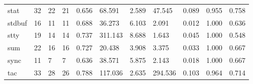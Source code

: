 \begin{longtable}{lp{1.2cm}p{1.2cm}p{1.2cm}p{1.2cm}p{1.2cm}p{1.2cm}p{1.2cm}p{1.2cm}p{1.2cm}p{1.2cm}}
stat      &                           32 &                 22 &                                21 &                                      0.656 &                                 68.591 &                                        2.589 &                            47.545 &                                   0.089 &                              0.955 &                                              0.758 \\
stdbuf    &                           16 &                 11 &                                11 &                                      0.688 &                                 36.273 &                                        6.103 &                             2.091 &                                   0.012 &                              1.000 &                                              0.636 \\
stty      &                           19 &                 14 &                                14 &                                      0.737 &                                311.143 &                                        8.688 &                             1.643 &                                   0.045 &                              1.000 &                                              0.548 \\
sum       &                           22 &                 16 &                                16 &                                      0.727 &                                 20.438 &                                        3.908 &                             3.375 &                                   0.033 &                              1.000 &                                              0.667 \\
sync      &                           11 &                  7 &                                 7 &                                      0.636 &                                 38.571 &                                        5.875 &                             2.143 &                                   0.018 &                              1.000 &                                              0.667 \\
tac       &                           33 &                 28 &                                26 &                                      0.788 &                                117.036 &                                        2.635 &                           294.536 &                                   0.103 &                              0.964 &                                              0.714 \\

\end{longtable}
